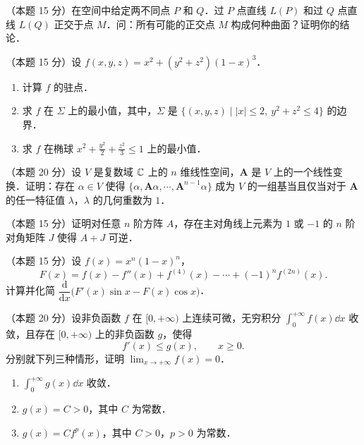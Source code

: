 
\begin{problems}
\item[一、]（本题 15 分）在空间中给定两不同点 $P$ 和 $Q$．过 $P$ 点直线 $L(P)$ 和过 $Q$ 点直线 $L(Q)$ 正交于点 $M$．问：所有可能的正交点 $M$ 构成何种曲面？证明你的结论．

\item[二、]（本题 15 分）设 $f(x,y,z)=x^{2}+(y^{2}+z^{2})(1-x)^{3}$．
\begin{enumerate}[label=(\arabic*)]
  \item 计算 $f$ 的驻点．
  \item 求 $f$ 在 $\Sigma$ 上的最小值，其中，$\Sigma$ 是 $\{(x,y,z)\mid |x|\le 2,\ y^{2}+z^{2}\le 4\}$ 的边界．
  \item 求 $f$ 在椭球 $x^{2}+\frac{y^{2}}{2}+\frac{z^{2}}{3}\le 1$ 上的最小值．
\end{enumerate}

\item[三、]（本题 20 分）设 $V$ 是复数域 $\mathbb{C}$ 上的 $n$ 维线性空间，$\bm{A}$ 是 $V$ 上的一个线性变换．证明：存在 $\alpha\in V$ 使得 $\{\alpha,\bm{A}\alpha,\cdots,\bm{A}^{n-1}\alpha\}$ 成为 $V$ 的一组基当且仅当对于 $\bm{A}$ 的任一特征值 $\lambda$，$\lambda$ 的几何重数为 $1$．

\item[四、]（本题 15 分）证明对任意 $n$ 阶方阵 $A$，存在主对角线上元素为 $1$ 或 $-1$ 的 $n$ 阶对角矩阵 $J$ 使得 $A+J$ 可逆．

\item[五、]（本题 15 分）设 $f(x)=x^{n}(1-x)^{n}$，
\[
  F(x)=f(x)-f''(x)+f^{(4)}(x)-\cdots+(-1)^{n}f^{(2n)}(x).
\]
计算并化简 $\dfrac{\mathrm{d}}{\mathrm{d}x}\bigl(F'(x)\sin x-F(x)\cos x\bigr)$．

\item[六、]（本题 20 分）设非负函数 $f$ 在 $[0,+\infty)$ 上连续可微，无穷积分 $\displaystyle\int_{0}^{+\infty}f(x)\dd x$ 收敛，且存在 $[0,+\infty)$ 上的非负函数 $g$，使得
\[
  f'(x)\le g(x),\qquad x\ge 0. \tag{1}
\]
分别就下列三种情形，证明 $\displaystyle\lim_{x\to+\infty}f(x)=0$．
\begin{enumerate}[label=(\roman*)]
  \item $\displaystyle\int_{0}^{+\infty}g(x)\dd x$ 收敛．
  \item $g(x)=C>0$，其中 $C$ 为常数．
  \item $g(x)=Cf^{p}(x)$，其中 $C>0$，$p>0$ 为常数．
\end{enumerate}
\end{problems}

